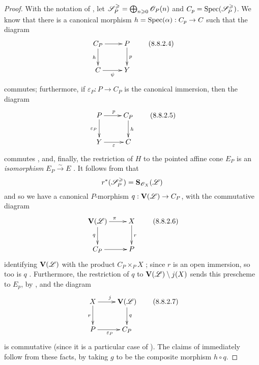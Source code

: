 \begin{proof}
With the notation of , let $\mathscr{S}_P^\geqslant = \bigoplus_{n\geqslant0}\mathscr{O}_P(n)$ and $C_p=\operatorname{Spec}(\mathscr{S}_P^\geqslant)$.
We know  that there is a canonical morphism $h=\Spec(\alpha):C_p\to C$ such that the diagram
\[
\label{II.8.8.2.4}
  \xymatrix{
    C_P
      \ar[r]
      \ar[d]_{h}
  & P
      \ar[d]^{p}
  \\C
      \ar[r]_{\psi}
  & Y
  }
\tag{8.8.2.4}
\]
commutes; furthermore, if $\varepsilon_P:P\to C_P$ is the canonical immersion, then the diagram
\[
\label{II.8.8.2.5}
  \xymatrix{
    P
      \ar[r]^{p}
      \ar[d]_{\varepsilon_P}
  & C_P
      \ar[d]^{h}
  \\Y
      \ar[r]_{\varepsilon}
  & C
  }
\tag{8.8.2.5}
\]
commutes , and, finally, the restriction of $H$ to the pointed affine cone $E_P$ is an \emph{isomorphism} $E_P\xrightarrow{\sim}E$ .
It follows from  that
\[
  r^*(\mathscr{S}_P^\geqslant) = \mathbf{S}_{\mathscr{O}_X}(\mathscr{L})
\]
and so we have a canonical $P$-morphism $q:\bb{V}(\sh{L})\to C_P$, with the commutative diagram
\[
\label{II.8.8.2.6}
  \xymatrix{
    \bb{V}(\sh{L})
      \ar[r]^{\pi}
      \ar[d]_{q}
  & X
      \ar[d]^{r}
  \\C_P
      \ar[r]
  & P
  }
\tag{8.8.2.6}
\]
identifying $\mathbf{V}(\mathscr{L})$ with the product $C_P\times_P X$ ;
since $r$ is an open immersion, so too is $q$ .
Furthermore, the restriction of $q$ to $\mathbf{V}(\mathscr{L})\setminus j(X)$ sends this prescheme to $E_p$, by , and the diagram
\[
\label{II.8.8.2.7}
  \xymatrix{
    X
      \ar[r]^{j}
      \ar[d]_{r}
  & \bb{V}(\sh{L})
      \ar[d]^{q}
  \\P
      \ar[r]_{\varepsilon_P}
  & C_P
  }
\tag{8.8.2.7}
\]
is commutative (since it is a particular case of ).
The claims of  immediately follow from these facts, by taking $g$ to be the composite morphism $h\circ q$.
\end{proof}


